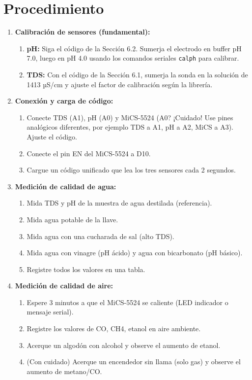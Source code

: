 \section*{Procedimiento}
\begin{enumerate}
    \item \textbf{Calibración de sensores (fundamental):}
    \begin{enumerate}
        \item \textbf{pH:} Siga el código de la Sección 6.2. Sumerja el electrodo en buffer pH 7.0, luego en pH 4.0 usando los comandos seriales \texttt{calph} para calibrar.
        \item \textbf{TDS:} Con el código de la Sección 6.1, sumerja la sonda en la solución de 1413 µS/cm y ajuste el factor de calibración según la librería.
    \end{enumerate}
    \item \textbf{Conexión y carga de código:}
    \begin{enumerate}
        \item Conecte TDS (A1), pH (A0) y MiCS-5524 (A0? ¡Cuidado! Use pines analógicos diferentes, por ejemplo TDS a A1, pH a A2, MiCS a A3). Ajuste el código.
        \item Conecte el pin EN del MiCS-5524 a D10.
        \item Cargue un código unificado que lea los tres sensores cada 2 segundos.
    \end{enumerate}
    \item \textbf{Medición de calidad de agua:}
    \begin{enumerate}
        \item Mida TDS y pH de la muestra de agua destilada (referencia).
        \item Mida agua potable de la llave.
        \item Mida agua con una cucharada de sal (alto TDS).
        \item Mida agua con vinagre (pH ácido) y agua con bicarbonato (pH básico).
        \item Registre todos los valores en una tabla.
    \end{enumerate}
    \item \textbf{Medición de calidad de aire:}
    \begin{enumerate}
        \item Espere 3 minutos a que el MiCS-5524 se caliente (LED indicador o mensaje serial).
        \item Registre los valores de CO, CH4, etanol en aire ambiente.
        \item Acerque un algodón con alcohol y observe el aumento de etanol.
        \item (Con cuidado) Acerque un encendedor sin llama (solo gas) y observe el aumento de metano/CO.
    \end{enumerate}
\end{enumerate}

